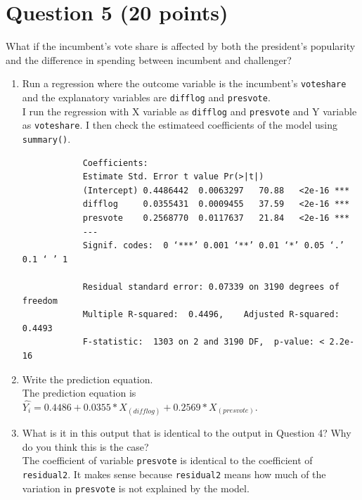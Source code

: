 \documentclass[12pt,letterpaper]{article}
\begin{document}
\section*{Question 5 (20 points)}
\noindent What if the incumbent's vote share is affected by both the president's popularity and the difference in spending between incumbent and challenger? 
	\begin{enumerate}
		\item Run a regression where the outcome variable is the incumbent's \texttt{voteshare} and the explanatory variables are \texttt{difflog} and \texttt{presvote}.\\	
		I run the regression with X variable as \texttt{difflog} and \texttt{presvote} and Y variable as \texttt{voteshare}. I then check the estimateed coefficients of the model using \texttt{summary()}.\\
		  	
		\begin{footnotesize}
			
			\begin{verbatim}
			Coefficients:
			Estimate Std. Error t value Pr(>|t|)    
			(Intercept) 0.4486442  0.0063297   70.88   <2e-16 ***
			difflog     0.0355431  0.0009455   37.59   <2e-16 ***
			presvote    0.2568770  0.0117637   21.84   <2e-16 ***
			---
			Signif. codes:  0 ‘***’ 0.001 ‘**’ 0.01 ‘*’ 0.05 ‘.’ 0.1 ‘ ’ 1
			
			Residual standard error: 0.07339 on 3190 degrees of freedom
			Multiple R-squared:  0.4496,	Adjusted R-squared:  0.4493 
			F-statistic:  1303 on 2 and 3190 DF,  p-value: < 2.2e-16
			\end{verbatim}
		\end{footnotesize}
	\vspace{.25cm}
	\item Write the prediction equation.\\
	
	The prediction equation is $\hat{Y_{i}}=0.4486+0.0355*X_(difflog)+0.2569*X_(presvote)$.\\
		\item What is it in this output that is identical to the output in Question 4? Why do you think this is the case?\\
	The coefficient of variable \texttt{presvote} is identical to the coefficient of \texttt{residual2}. It makes sense because \texttt{residual2} means how much of the variation in \texttt{presvote} is not explained by the model. 
	\end{enumerate}
\end{document}
